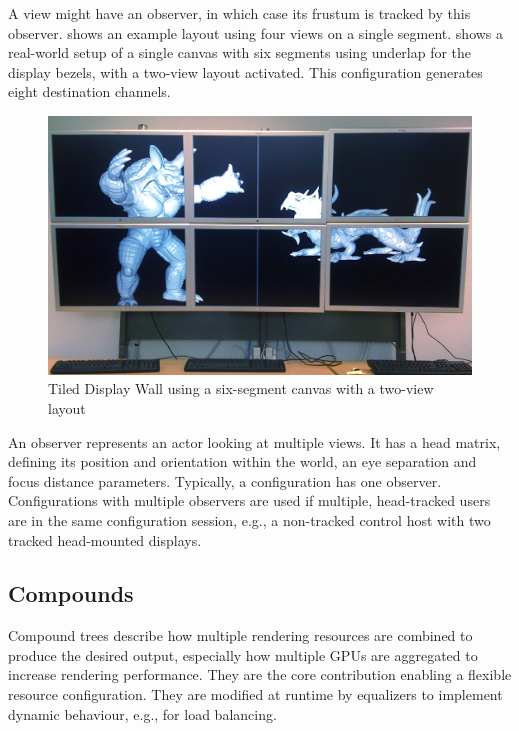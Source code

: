 A view might have an observer, in which case its frustum is tracked by this
observer.  shows an example layout using four views on a single
segment.  shows a real-world setup of a single canvas with six
segments using underlap for the display bezels, with a two-view layout
activated. This configuration generates eight destination channels.

\begin{figure}[t]\center
 \includegraphics[width=\textwidth]{images/wallLayout.jpg}
 {\caption{\label{fDisplay}Tiled Display Wall using a six-segment canvas with a two-view layout}}
\end{figure}

An \textsf{observer} represents an actor looking at multiple views. It has a
head matrix, defining its position and orientation within the world, an eye
separation and focus distance parameters. Typically, a configuration has one
observer. Configurations with multiple observers are used if multiple,
head-tracked users are in the same configuration session, e.g., a non-tracked
control host with two tracked head-mounted displays.

\subsection{Compounds}

Compound trees describe how multiple rendering resources are combined to
produce the desired output, especially how multiple GPUs are aggregated to
increase rendering performance. They are the core contribution enabling a
flexible resource configuration. They are modified at runtime by
\textsf{equalizers} to implement dynamic behaviour, e.g., for load balancing.

